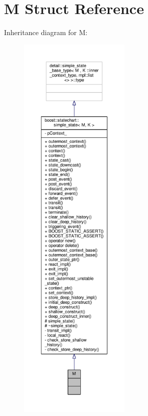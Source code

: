 \hypertarget{struct_m}{}\section{M Struct Reference}
\label{struct_m}


Inheritance diagram for M\+:
\nopagebreak
\begin{figure}[H]
\begin{center}
\leavevmode
\includegraphics[height=550pt]{struct_m__inherit__graph}
\end{center}
\end{figure}


